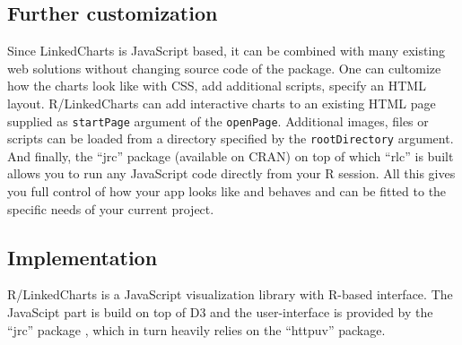 \documentclass[twocolumn,10pt]{article}
\begin{document}
\subsection{Further customization}

Since LinkedCharts is JavaScript based, it can be combined with many existing web solutions without changing source code of the package. One can cultomize how the charts look like with CSS, add additional scripts, specify an HTML layout. R/LinkedCharts can add interactive charts to an existing HTML page supplied as \texttt{startPage} argument of the \texttt{openPage}. Additional images, files or scripts can be loaded from a directory specified by the \texttt{rootDirectory} argument. And finally, the ``jrc'' package (available on CRAN) on top of which ``rlc'' is built allows you to run any JavaScript code directly from your R session.
All this gives you full control of how your app looks like and behaves and can be fitted to the specific needs of your current project.

\subsection{Implementation}

R/LinkedCharts is a JavaScript visualization library with R-based \citep{R_2019} interface. The JavaScipt part is build on top of D3 \citep{bostock_2011} and the user-interface is provided by the ``jrc'' package \citep{jrc_2020}, which in turn heavily relies on the ``httpuv'' \citep{cheng_2020} package.

\begin{small} 
\balance

\end{small}
\end{document}
